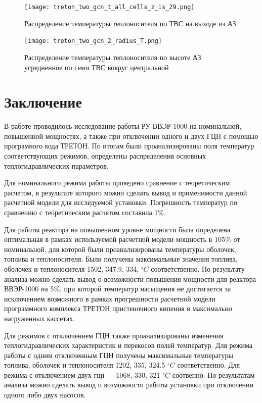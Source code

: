 \begin{figure}[H]
	\begin{center}
		\texttt{[image: treton\_two\_gcn\_t\_all\_cells\_z\_is\_29.png]}
		\caption{Распределение температуры теплоносителя по ТВС на выходе из АЗ}
		\label{pic:treton-two-gcn-t-all-cells-z-is-29}
	\end{center}
\end{figure}

\begin{figure}[H]
	\begin{center}
		\texttt{[image: treton\_two\_gcn\_2\_radius\_T.png]}
		\caption{Распределение температуры теплоносителя по высоте АЗ усредненное по семи ТВС вокруг центральной}
		\label{pic:treton-two-gcn-2-radius-T}
	\end{center}
\end{figure}

\section{Заключение}
В работе проводилось исследование работы РУ ВВЭР-1000 на номинальной, повышенной мощностях, а также при отключении одного и двух ГЦН с помощью програмного кода ТРЕТОН. По итогам были проанализированы поля температур соответствующих режимов, определены распределения основных теплогидравлических параметров. 

Для номинального режима работы проведено сравнение с теоретическим расчетом, в результате которого можно сделать вывод и применимости данной расчетной модели для исследуемой установки. Погрешность температур по сравнению с теоретическим расчетом составила 1\%.

Для работы реактора на повышенном уровне мощности была определена оптимальная в рамках используемой расчетной модели мощность в 105\% от номинальной, для которой были проанализированы температуры оболочек, топлива и теплоносителя. Были получены максимальные значения топлива, оболочек и теплоносителя 1502, 347.9, 334, $^\circ C$ соответственно. По результату анализа можно сделать вывод о возможности повышения мощности для реактора ВВЭР-1000 на 5\%, при которой температур насыщения не достигается за исключением возможного в рамках прогрешности расчетной модели программного комплекса ТРЕТОН пристеночного кипения в максимально нагруженных кассетах.

Для режимов с отключением ГЦН также проанализированы изменения теплогидравлических характеристик и перекосов полей температур. Для режима работы с одним отключенным ГЦН получены максимальные температуры топлива, оболочек и теплоносителя 1202, 335, 324.5 $^\circ C$ соответственно. Для режима с отключением двух гцн — 1068, 330, 321 $^\circ C$ соотвенно. По результатам анализа можно сделать вывод о возможности работы установки при отключении одного либо двух насосов.
